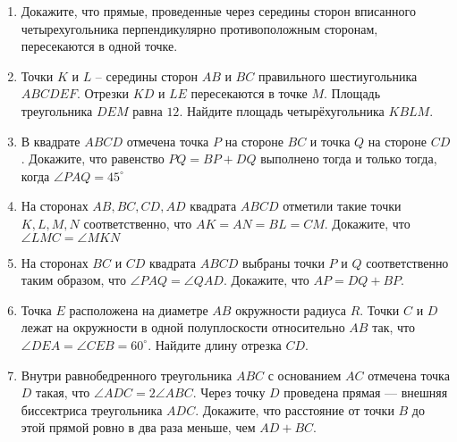 \documentclass{article}
\begin{document}
\begin{enumerate}[label*=\protect\fbox{\arabic{enumi}}]
\item Докажите, что прямые, проведенные через середины сторон вписанного четырехугольника перпендикулярно противоположным сторонам, пересекаются в одной точке. 

\item Точки $K$ и $L$ – середины сторон $AB$ и $BC$ правильного шестиугольника $ABCDEF$. Отрезки $KD$ и $LE$ пересекаются в точке $M$. Площадь треугольника $DEM$ равна $12$. Найдите площадь четырёхугольника $KBLM$.

\item В квадрате $ABCD$ отмечена точка $P$ на стороне $BC$ и точка $Q$ на стороне $CD$. Докажите, что равенство $PQ = BP + DQ$ выполнено тогда и только тогда, когда $\angle PAQ = 45^\circ$

\item На сторонах $AB, BC, CD, AD$ квадрата $ABCD$ отметили такие точки $K, L, M, N$ соответственно, что $AK=AN=BL=CM$. Докажите, что $\angle LMC= \angle MKN$

\item На сторонах $BC$ и $CD$ квадрата $ABCD$ выбраны точки $P$ и $Q$ соответственно таким образом, что $\angle PAQ= \angle QAD$. Докажите, что $AP=DQ+BP$.

\item Точка $E$ расположена на диаметре $AB$ окружности радиуса $R$. Точки $C$ и $D$ лежат на окружности в одной полуплоскости относительно $AB$ так, что $\angle DEA=\angle CEB=60^\circ.$ Найдите длину отрезка $CD$.

\item Внутри равнобедренного треугольника $ABC$ с основанием $AC$ отмечена точка $D$ такая, что $\angle ADC=2\angle ABC$. Через точку $D$ проведена прямая — внешняя биссектриса треугольника $ADC$. Докажите, что расстояние от точки $B$ до этой прямой ровно в два раза меньше, чем $AD+BC$.






\end{enumerate}
\end{document}
